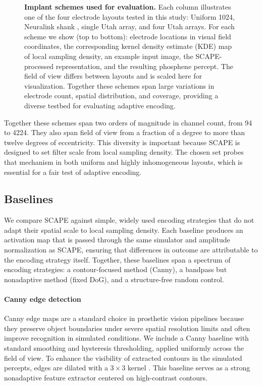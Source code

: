 \begin{figure}[ht!]
    \caption{\textbf{Implant schemes used for evaluation.} 
    Each column illustrates one of the four electrode layouts tested in this study: Uniform 1024, Neuralink shank \cite{Musk2019,Zhao2023}, single Utah array, and four Utah arrays. For each scheme we show (top to bottom): electrode locations in visual field coordinates, the corresponding kernel density estimate (KDE) map of local sampling density, an example input image, the SCAPE-processed representation, and the resulting phosphene percept. The field of view differs between layouts and is scaled here for visualization. Together these schemes span large variations in electrode count, spatial distribution, and coverage, providing a diverse testbed for evaluating adaptive encoding.}
    \label{fig:implant_schemes}
\end{figure}

\medskip
Together these schemes span two orders of magnitude in channel count, from 94 to 4224. They also span field of view from a fraction of a degree to more than twelve degrees of eccentricity. This diversity is important because SCAPE is designed to set filter scale from local sampling density. The chosen set probes that mechanism in both uniform and highly inhomogeneous layouts, which is essential for a fair test of adaptive encoding.


\subsection{Baselines}
We compare SCAPE against simple, widely used encoding strategies that do not adapt their spatial scale to local sampling density. Each baseline produces an activation map that is passed through the same simulator and amplitude normalization as SCAPE, ensuring that differences in outcome are attributable to the encoding strategy itself.  
Together, these baselines span a spectrum of encoding strategies: a contour-focused method (Canny), a bandpass but nonadaptive method (fixed DoG), and a structure-free random control.

\paragraph{Canny edge detection}
Canny edge maps are a standard choice in prosthetic vision pipelines because they preserve object boundaries under severe spatial resolution limits and often improve recognition in simulated conditions. We include a Canny baseline with standard smoothing and hysteresis thresholding, applied uniformly across the field of view. To enhance the visibility of extracted contours in the simulated percepts, edges are dilated with a $3 \times 3$ kernel \cite{deRuytervanSteveninck2020}. This baseline serves as a strong nonadaptive feature extractor centered on high-contrast contours.

